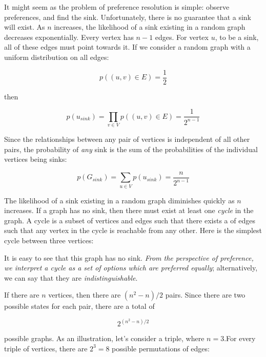 It might seem as the problem of preference resolution is simple: observe preferences, and find the sink.
Unfortunately, there is no guarantee that a sink will exist.
As $n$ increases, the likelihood of a sink existing in a random graph decreases exponentially.
Every vertex has $n-1$ edges.
For vertex $u$, to be a sink, all of these edges must point towards it.
If we consider a random graph with a uniform distribution on all edges:

\[
p((u,v) \in E)= \frac{1}{2}
\]

then

\[
p(u_{sink}) = \prod_{v \in V}p((u,v) \in E) = \frac{1}{2^{n-1}}
\]

Since the relationships between any pair of vertices is independent of all other pairs, the probability of \textit{any} sink is the sum of the probabilities of the individual vertices being sinks:

\[
p(G_{sink}) = \sum_{u \in V}p(u_{sink}) = \frac{n}{2^{n-1}}
\]

The likelihood of a sink existing in a random graph diminishes quickly as $n$ increases.
If a graph has no sink, then there must exist at least one \textit{cycle} in the graph.
A cycle is a subset of vertices and edges such that there exists a  of edges such that any vertex in the cycle is reachable from any other.
Here is the simplest cycle between three vertices:

\begin{center}
\end{center}

It is easy to see that this graph has no sink.
\textit{From the perspective of preference, we interpret a cycle as a set of options which are preferred equally}; alternatively, we can say that they are \textit{indistinguishable}.

If there are $n$ vertices, then there are $(n^2-n)/2$ pairs.
Since there are two possible states for each pair, there are a total of

\[
2^{(n^2-n)/2}
\]

possible graphs.
As an illustration, let's consider a triple, where $n = 3$.For every triple of vertices, there are $2^3 = 8$ possible permutations of edges:

